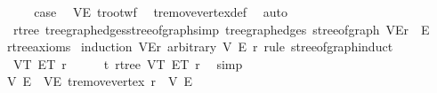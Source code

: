\begin{isabellebody}
\ \ \isamarkupfalse%
\ \isamarkupfalse%
\ {\isacharquery}{\kern0pt}case\ \isamarkupfalse%
\ VE{\isacharprime}{\kern0pt}\ t{\isachardot}{\kern0pt}root{\isacharunderscore}{\kern0pt}wf\ \isamarkupfalse%
\ t{\isachardot}{\kern0pt}remove{\isacharunderscore}{\kern0pt}vertex{\isacharunderscore}{\kern0pt}def\ \isamarkupfalse%
\ auto\isanewline
{}\isamarkupfalse%
%
\endisatagproof
{\isafoldproof}%
%
\isadelimproof
\isanewline
%
\endisadelimproof
\isanewline
{}\isamarkupfalse%
\ {\isacharparenleft}{\kern0pt}\ rtree{\isacharparenright}{\kern0pt}\ tree{\isacharunderscore}{\kern0pt}graph{\isacharunderscore}{\kern0pt}edges{\isacharunderscore}{\kern0pt}stree{\isacharunderscore}{\kern0pt}of{\isacharunderscore}{\kern0pt}graph{\isacharbrackleft}{\kern0pt}simp{\isacharbrackright}{\kern0pt}{\isacharcolon}{\kern0pt}\ {\isachardoublequoteopen}tree{\isacharunderscore}{\kern0pt}graph{\isacharunderscore}{\kern0pt}edges\ {\isacharparenleft}{\kern0pt}stree{\isacharunderscore}{\kern0pt}of{\isacharunderscore}{\kern0pt}graph\ {\isacharparenleft}{\kern0pt}V{\isacharcomma}{\kern0pt}E{\isacharcomma}{\kern0pt}r{\isacharparenright}{\kern0pt}{\isacharparenright}{\kern0pt}\ {\isacharequal}{\kern0pt}\ E{\isachardoublequoteclose}\isanewline
%
\isadelimproof
\ \ %
\endisadelimproof
%
\isatagproof
{}\isamarkupfalse%
\ rtree{\isacharunderscore}{\kern0pt}axioms\isanewline
{}\isamarkupfalse%
\ {\isacharparenleft}{\kern0pt}induction\ {\isachardoublequoteopen}{\isacharparenleft}{\kern0pt}V{\isacharcomma}{\kern0pt}E{\isacharcomma}{\kern0pt}r{\isacharparenright}{\kern0pt}{\isachardoublequoteclose}\ arbitrary{\isacharcolon}{\kern0pt}\ V\ E\ r\ rule{\isacharcolon}{\kern0pt}\ stree{\isacharunderscore}{\kern0pt}of{\isacharunderscore}{\kern0pt}graph{\isachardot}{\kern0pt}induct{\isacharparenright}{\kern0pt}\isanewline
\ \ \isamarkupfalse%
\ {\isacharparenleft}{\kern0pt}{}\ V\isactrlsub T\ E\isactrlsub T\ r{\isacharparenright}{\kern0pt}\isanewline
\ \ \isamarkupfalse%
\ \isamarkupfalse%
\ t{\isacharcolon}{\kern0pt}\ rtree\ V\isactrlsub T\ E\isactrlsub T\ r\ \isamarkupfalse%
\ simp\isanewline
\ \ \isamarkupfalse%
\ V{\isacharprime}{\kern0pt}\ E{\isacharprime}{\kern0pt}\ \ VE{\isacharprime}{\kern0pt}{\isacharcolon}{\kern0pt}\ {\isachardoublequoteopen}t{\isachardot}{\kern0pt}remove{\isacharunderscore}{\kern0pt}vertex\ r\ {\isacharequal}{\kern0pt}\ {\isacharparenleft}{\kern0pt}V{\isacharprime}{\kern0pt}{\isacharcomma}{\kern0pt}\ E{\isacharprime}{\kern0pt}{\isacharparenright}{\kern0pt}{\isachardoublequoteclose}\ \isamarkupfalse%

\end{isabellebody}
